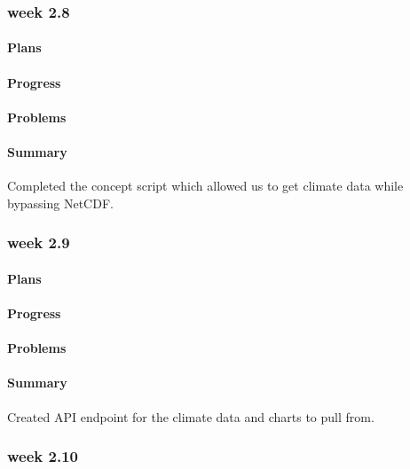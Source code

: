 \documentclass[onecolumn, draftclsnofoot,10pt, compsoc]{article}
\begin{document}
		\subsubsection{week 2.8}
			\paragraph{Plans} \hfill \break

			\paragraph{Progress} \hfill \break

			\paragraph{Problems} \hfill \break

			\paragraph{Summary} \hfill \break
			    Completed the concept script which allowed us to get climate data while bypassing NetCDF.

		\subsubsection{week 2.9}
			\paragraph{Plans} \hfill \break

			\paragraph{Progress} \hfill \break

			\paragraph{Problems} \hfill \break

			\paragraph{Summary} \hfill \break
                Created API endpoint for the climate data and charts to pull from.

		\subsubsection{week 2.10}
\end{document}
